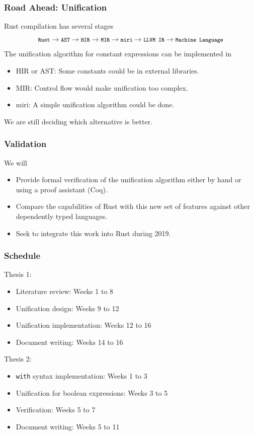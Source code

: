 \documentclass{beamer}
\newcommand{\code}[1] {\texttt{\footnotesize #1}}
\begin{document}
\begin{frame}[fragile]
    \frametitle{Road Ahead: Unification}
    Rust compilation has several stages
    $$\code{Rust} \rightarrow \code{AST} \rightarrow \code{HIR} \rightarrow \code{MIR} \rightarrow \code{miri} \rightarrow \code{LLVM IR} \rightarrow \code{Machine Language}$$
    The unification algorithm for constant expressions can be implemented in
    \begin{itemize}
        \item HIR or AST: Some constants could be in external libraries.
        \item MIR: Control flow would make unification too complex. 
        \item miri: A simple unification algorithm could be done.
    \end{itemize}
    We are still deciding which alternative is better.
\end{frame}

\begin{frame}[fragile]
    \frametitle{Validation}
    We will
    \begin{itemize}
        \item Provide formal verification of the unification algorithm either by hand or using a proof assistant (Coq).
        \item Compare the capabilities of Rust with this new set of features against other dependently typed languages.
        \item Seek to integrate this work into Rust during 2019.
    \end{itemize}
\end{frame}

\begin{frame}[fragile]
    \frametitle{Schedule}
    Thesis 1:
    \begin{itemize}
        \item Literature review: Weeks 1 to 8
        \item Unification design: Weeks 9 to 12
        \item Unification implementation: Weeks 12 to 16
        \item Document writing: Weeks 14 to 16
    \end{itemize}
    Thesis 2:
    \begin{itemize}
        \item \code{with} syntax implementation: Weeks 1 to 3
        \item Unification for boolean expressions: Weeks 3 to 5
        \item Verification: Weeks 5 to 7
        \item Document writing: Weeks 5 to 11
    \end{itemize}
\end{frame}
\end{document}
